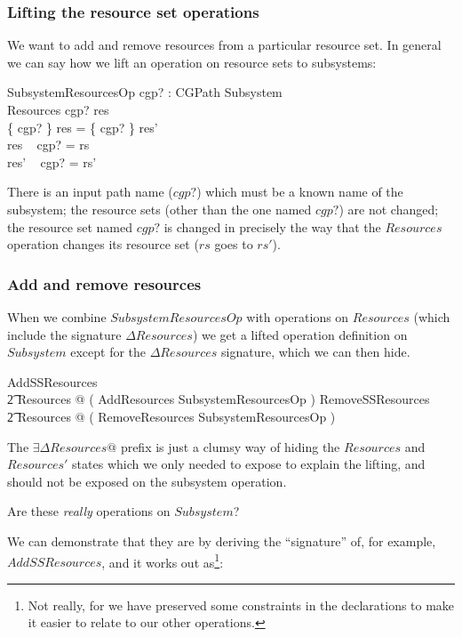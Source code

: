 \documentclass[a4paper,twoside,12pt]{article}
\begin{document}
\subsubsection{Lifting the resource set operations}
We want to add and remove resources from a particular resource set. In general we can say
how we lift an operation on resource sets to subsystems:

\begin{schema}{SubsystemResourcesOp}
cgp? : CGPath
\also
\Delta Subsystem \\
\Delta Resources
\where
cgp? \in \dom res \\
\{ cgp? \} \ndres res = \{ cgp? \} \ndres res' \\
res ~ cgp? = rs \\
res' ~ cgp? = rs'
\end{schema}
There is an input path name ($cgp?$) which must be a known name of the subsystem;
the resource sets (other than the one named $cgp?$) are not changed;
the resource set named $cgp?$ is changed in precisely the way that the $Resources$ operation changes
its resource set ($rs$ goes to $rs'$).

\subsubsection{Add and remove resources}
When we combine $SubsystemResourcesOp$ with operations on $Resources$ 
(which include the signature $\Delta Resources$)
we get a lifted operation definition on $Subsystem$ except for the $\Delta Resources$ signature, 
which we can then hide.

\begin{zed}
AddSSResources  \\
\t2 \exists \Delta Resources @ ( AddResources \land SubsystemResourcesOp )
\also
RemoveSSResources  \\
\t2 \exists \Delta Resources @ ( RemoveResources \land SubsystemResourcesOp )
\end{zed}
The $\exists \Delta Resources @$ prefix is just a clumsy way of hiding the $Resources$ and $Resources'$ states
which we only needed to expose to explain the lifting, and should not be exposed on the 
subsystem operation.

Are these \emph{really} operations on $Subsystem$?

We can demonstrate that they are by deriving the ``signature'' of, for example, $AddSSResources$, 
and it works out as\footnote{Not really,
for we have preserved some constraints in the declarations to make it easier to relate to our other operations.}:
\end{document}
